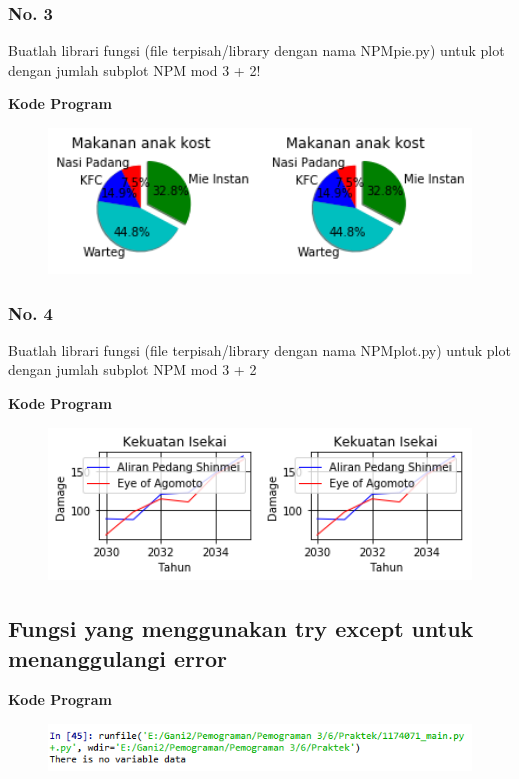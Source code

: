 \subsubsection{No. 3}
\hfill \break
Buatlah librari fungsi (file terpisah/library dengan nama NPMpie.py) untuk plot dengan jumlah subplot NPM mod 3 + 2!

\hfill \break
\textbf{Kode Program}



\begin{figure}[H]
	\includegraphics[width=12cm]{figures/6/1174071/Praktek/piepraktek.png}
	\centering
\end{figure}

\subsubsection{No. 4}
\hfill \break
Buatlah librari fungsi (file terpisah/library dengan nama NPMplot.py) untuk plot dengan jumlah subplot NPM mod 3 + 2

\hfill \break
\textbf{Kode Program}



\begin{figure}[H]
	\includegraphics[width=12cm]{figures/6/1174071/Praktek/plotpraktek.png}
	\centering
\end{figure}

\subsection{Fungsi yang menggunakan try except untuk menanggulangi error}

\hfill \break
\textbf{Kode Program}



\begin{figure}[H]
	\includegraphics[width=12cm]{figures/6/1174071/Praktek/errorpraktek.png}
	\centering
\end{figure}